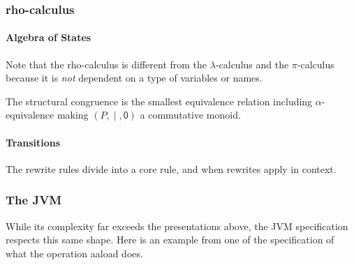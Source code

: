 \subsubsection{rho-calculus}

\paragraph{Algebra of States}
Note that the rho-calculus is different from the $\lambda$-calculus and the $\pi$-calculus because it is \emph{not} dependent on a type of variables or names.

The structural congruence is the smallest equivalence relation including $\alpha$-equivalence making $(P,\;\mathsf{|}\;,\mathsf{0})$ a commutative monoid.

\paragraph{Transitions}
The rewrite rules divide into a core rule, and when rewrites apply in
context.

\pagebreak
\subsubsection{The JVM}

While its complexity far exceeds the presentations above, the JVM specification respects this same shape. Here is an example from one of the specification of what the operation aaload does.

